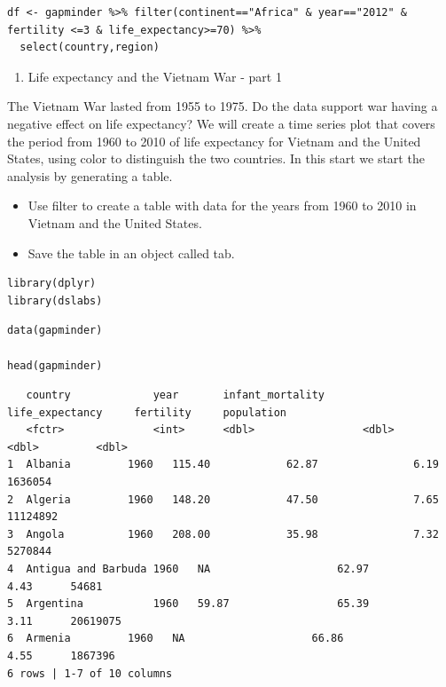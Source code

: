 \documentclass[
]{article}
\providecommand{\tightlist}{%
  \setlength{\itemsep}{0pt}\setlength{\parskip}{0pt}}
\begin{document}
\begin{verbatim}
df <- gapminder %>% filter(continent=="Africa" & year=="2012" & fertility <=3 & life_expectancy>=70) %>%
  select(country,region)
\end{verbatim}

\begin{enumerate}
\def\labelenumi{\arabic{enumi}.}
\setcounter{enumi}{3}
\tightlist
\item
  Life expectancy and the Vietnam War - part 1
\end{enumerate}

The Vietnam War lasted from 1955 to 1975. Do the data support war having
a negative effect on life expectancy? We will create a time series plot
that covers the period from 1960 to 2010 of life expectancy for Vietnam
and the United States, using color to distinguish the two countries. In
this start we start the analysis by generating a table.

\begin{itemize}
\tightlist
\item
  Use filter to create a table with data for the years from 1960 to 2010
  in Vietnam and the United States.
\item
  Save the table in an object called tab.
\end{itemize}

\begin{verbatim}
library(dplyr)
library(dslabs)
\end{verbatim}

\begin{verbatim}
data(gapminder)

head(gapminder)
\end{verbatim}

\begin{verbatim}
   country             year       infant_mortality      life_expectancy     fertility     population
   <fctr>              <int>      <dbl>                 <dbl>               <dbl>         <dbl>
1  Albania         1960   115.40            62.87               6.19      1636054   
2  Algeria         1960   148.20            47.50               7.65      11124892  
3  Angola          1960   208.00            35.98               7.32      5270844   
4  Antigua and Barbuda 1960   NA                    62.97               4.43      54681 
5  Argentina           1960   59.87                 65.39               3.11      20619075  
6  Armenia         1960   NA                    66.86               4.55      1867396   
6 rows | 1-7 of 10 columns
\end{verbatim}
\end{document}

